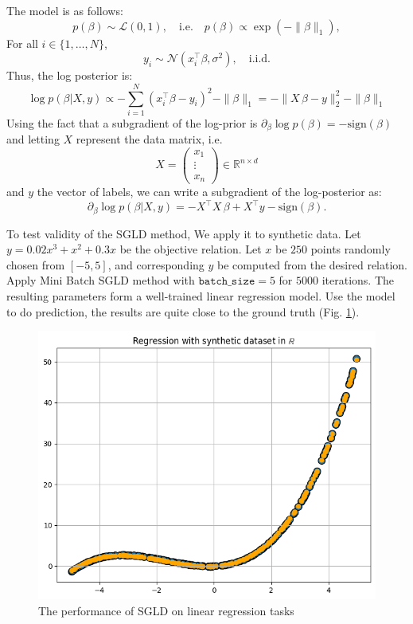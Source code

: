 \documentclass[10pt]{amsart}
\begin{document}
The model is as follows:
\[
p(\beta) \sim \mathcal{L}(0, 1), \quad \text{i.e.} \quad p(\beta) \propto \exp(-\|\beta\|_1),
\]
For all \( i \in \{1, \dots, N\} \), 
\[
y_i \sim \mathcal{N}(x_i^{\top}\beta, \sigma^2), \quad \text{i.i.d.}
\]
Thus, the log posterior is:
\[
\log p(\beta | X, y) \propto - \sum_{i=1}^N (x_i^{\top}\beta - y_i)^2 - \|\beta \|_1 = - \|X\, \beta - y\|_2^2 - \|\beta \|_1
\]
Using the fact that a subgradient of the log-prior is \( \partial_{\beta} \log p(\beta) = - \mathrm{sign}(\beta) \) and letting \( X \) represent the data matrix, i.e.
\[
X = \begin{pmatrix}
x_1\\
\vdots\\
x_n
\end{pmatrix} \in \mathbb{R}^{n \times d}
\]
and \( y \) the vector of labels, we can write a subgradient of the log-posterior as:
\[
\partial_{\beta} \log p(\beta | X, y) = - X^{\top}X \, \beta + X^{\top}y - \mathrm{sign}(\beta).
\]

To test validity of the SGLD method, We apply it to synthetic data. Let $y=0.02x^3+x^2+0.3x$ be the objective relation. Let $x$ be $250$ points randomly chosen from $[-5,5]$, and corresponding $y$ be computed from the desired relation. Apply Mini Batch SGLD method with $\texttt{batch\_size}=5$ for $5000$ iterations. The resulting parameters form a well-trained linear regression model. Use the model to do prediction, the results are quite close to the ground truth (Fig. \ref{fig:lr}).
\begin{figure}[ht]
    \centering
    \includegraphics[width=0.5\linewidth]{graph/SGLD_LR.png}
    \caption{The performance of SGLD on linear regression tasks}
    \label{fig:lr}
\end{figure}
\end{document}
